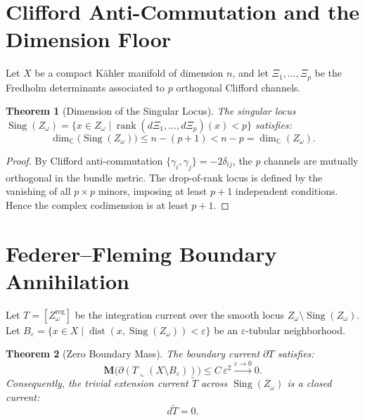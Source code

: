 \documentclass[11pt,a4paper]{article}
\newtheorem{theorem}{Theorem}[section]
\theoremstyle{definition}
\begin{document}
\section{Clifford Anti-Commutation and the Dimension Floor}

Let $X$ be a compact K\"ahler manifold of dimension $n$, and let $\Xi_1, \dots, \Xi_p$ be the Fredholm determinants associated to $p$ orthogonal Clifford channels.
\begin{theorem}[Dimension of the Singular Locus]
The singular locus $\operatorname{Sing}(Z_\omega) = \{ x \in Z_\omega \mid \operatorname{rank}(d\Xi_1, \dots, d\Xi_p)(x) < p \}$ satisfies:
\begin{equation}
  \dim_{\mathbb{C}}\bigl( \operatorname{Sing}(Z_\omega) \bigr) \le n - (p + 1) < n - p = \dim_{\mathbb{C}}(Z_\omega).
\end{equation}
\end{theorem}
\begin{proof}
By Clifford anti-commutation $\{\gamma_i, \gamma_j\} = -2\delta_{ij}$, the $p$ channels are mutually orthogonal in the bundle metric. The drop-of-rank locus is defined by the vanishing of all $p \times p$ minors, imposing at least $p + 1$ independent conditions. Hence the complex codimension is at least $p + 1$.
\end{proof}

\section{Federer--Fleming Boundary Annihilation}

Let $T = [Z_{\omega}^{\mathrm{reg}}]$ be the integration current over the smooth locus $Z_\omega \setminus \operatorname{Sing}(Z_\omega)$.
Let $B_\varepsilon = \{ x \in X \mid \operatorname{dist}(x, \operatorname{Sing}(Z_\omega)) < \varepsilon \}$ be an $\varepsilon$-tubular neighborhood.
\begin{theorem}[Zero Boundary Mass]
The boundary current $\partial T$ satisfies:
\begin{equation}
  \mathbf{M}\bigl( \partial (T \llcorner (X \setminus B_\varepsilon)) \bigr) \le C\,\varepsilon^2 \xrightarrow{\varepsilon \to 0} 0.
\end{equation}
Consequently, the trivial extension current $\tilde{T}$ across $\operatorname{Sing}(Z_\omega)$ is a closed current:
\begin{equation}
  d\tilde{T} = 0.
\end{equation}
\end{theorem}
\end{document}
